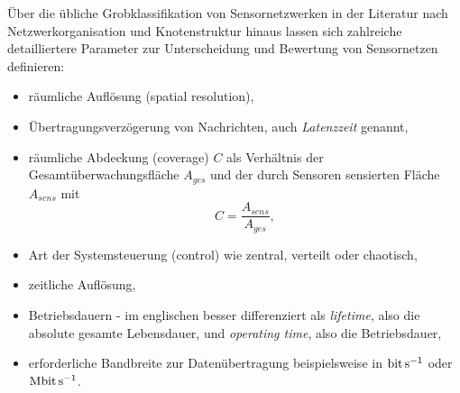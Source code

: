 Über die übliche Grobklassifikation von Sensornetzwerken in der Literatur nach Netzwerkorganisation und Knotenstruktur hinaus lassen sich zahlreiche detailliertere Parameter zur Unterscheidung und Bewertung von Sensornetzen definieren:
\begin{itemize}
\item räumliche Auflösung (spatial resolution),
\item Übertragungsverzögerung von Nachrichten, auch \emph{Latenzzeit} genannt,
\item räumliche Abdeckung (coverage) $C$ als Verhältnis der Gesamtüberwachungsfläche $A_{ges}$ und der durch Sensoren sensierten Fläche $A_{sens}$ mit 
\begin{equation}
	C = \frac{A_{sens}}{A_{ges}},
\end{equation}
\item Art der Systemsteuerung (control) wie zentral, verteilt oder chaotisch,
\item zeitliche Auflösung,
\item Betriebsdauern - im englischen besser differenziert als \emph{lifetime}, also die absolute gesamte Lebensdauer, und \emph{operating time}, also die Betriebsdauer,
\item erforderliche Bandbreite zur Datenübertragung beispielsweise in $\SI{}{\bit\per\second}$ oder $\SI{}{\mega\bit\per\second}$.
\end{itemize}

